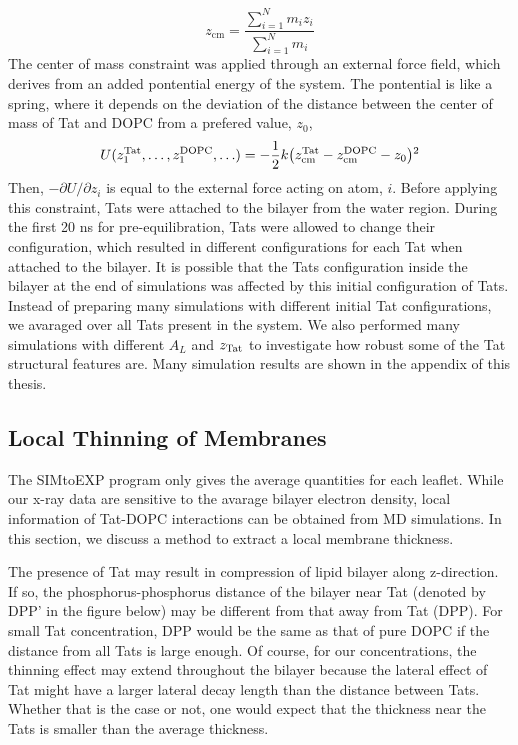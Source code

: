 \documentclass[12pt,letterpaper]{article}
\begin{document}
\begin{equation}
  z_{\mathrm{cm}} = \frac{\sum\limits_{i=1}^N m_iz_i}{\sum\limits_{i=1}^N m_i}
\end{equation}
The center of mass constraint was applied through an external force field,
which derives from an added pontential energy of the system. The pontential 
is like a spring, where it depends on the deviation of the distance 
between the center of mass of Tat and DOPC from a prefered value, $z_0$,
\begin{equation}
  U(z_1^{\mathrm{Tat}},\ldots,z_1^{\mathrm{DOPC}},\ldots) = 
  -\frac{1}{2} k 
  \mathopen{}\left( z_{\mathrm{cm}}^{\mathrm{Tat}} - z_{\mathrm{cm}}^{\mathrm{DOPC}} - z_0 \right)\mathclose{}^2
\end{equation}
Then, $-\partial U/\partial z_i$ is equal to the external force acting 
on atom, $i$. Before applying this constraint, Tats were attached to 
the bilayer from the water region. During the first 20 ns for 
pre-equilibration, Tats were allowed to change their configuration,
which resulted in different configurations for each Tat when attached
to the bilayer. It is possible that the Tats configuration inside the
bilayer at the end of simulations was affected by this initial 
configuration of Tats. Instead of preparing many simulations with
different initial Tat configurations, we avaraged over all Tats
present in the system. We also performed many simulations with
different $A_L$ and $z_{\mathrm{Tat}}$ to investigate how robust some of the 
Tat structural features are. Many simulation results are shown in
the appendix of this thesis. 


\subsection{Local Thinning of Membranes}
The SIMtoEXP program only gives the average quantities for each leaflet. 
While our x-ray data are sensitive to the avarage bilayer electron density,
local information of Tat-DOPC interactions can be obtained from MD simulations.
In this section, we discuss a method to extract a local membrane thickness.

The presence of Tat may result in compression of lipid bilayer along z-direction. 
If so, the phosphorus-phosphorus distance of the bilayer near Tat (denoted by DPP'
in the figure below) may be different from that away from Tat (DPP).  For 
small Tat concentration, DPP would be the same as that of pure DOPC if the 
distance from all Tats is large enough.  Of course, for our concentrations, 
the thinning effect may extend throughout the bilayer because the lateral
effect of Tat might have a larger lateral decay length than the distance 
between Tats.  Whether that is the case or not, one would expect that the 
thickness near the Tats is smaller than the average thickness.
\end{document}
